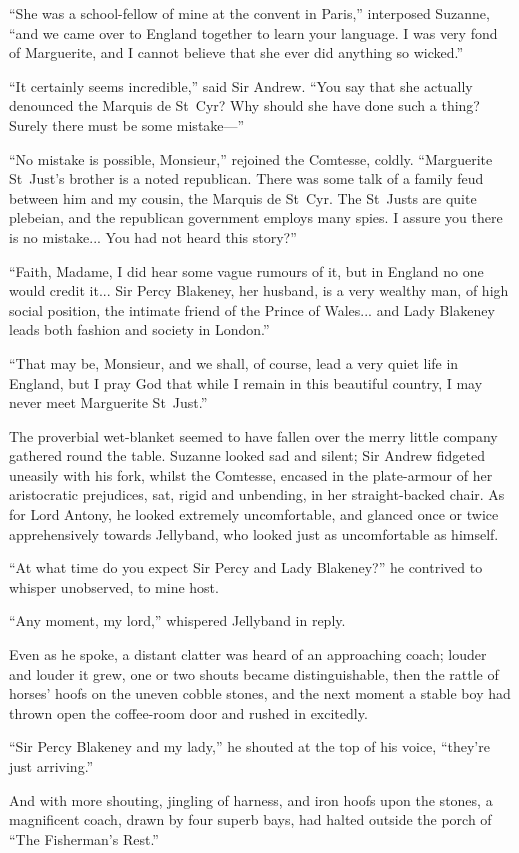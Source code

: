 \enquote{She was a school-fellow of mine at the convent in Paris,} interposed Suzanne, \enquote{and we came over to England together to learn your language. I was very fond of Marguerite, and I cannot believe that she ever did anything so wicked.}

\enquote{It certainly seems incredible,} said Sir Andrew. \enquote{You say that she actually denounced the Marquis de St~Cyr? Why should she have done such a thing? Surely there must be some mistake---}

\enquote{No mistake is possible, Monsieur,} rejoined the Comtesse, coldly. \enquote{Marguerite St~Just's brother is a noted republican. There was some talk of a family feud between him and my cousin, the Marquis de St~Cyr. The St~Justs are quite plebeian, and the republican government employs many spies. I assure you there is no mistake... You had not heard this story?}

\enquote{Faith, Madame, I did hear some vague rumours of it, but in England no one would credit it... Sir Percy Blakeney, her husband, is a very wealthy man, of high social position, the intimate friend of the Prince of Wales... and Lady Blakeney leads both fashion and society in London.}

\enquote{That may be, Monsieur, and we shall, of course, lead a very quiet life in England, but I pray God that while I remain in this beautiful country, I may never meet Marguerite St~Just.}

The proverbial wet-blanket seemed to have fallen over the merry little company gathered round the table. Suzanne looked sad and silent; Sir Andrew fidgeted uneasily with his fork, whilst the Comtesse, encased in the plate-armour of her aristocratic prejudices, sat, rigid and unbending, in her straight-backed chair. As for Lord Antony, he looked extremely uncomfortable, and glanced once or twice apprehensively towards Jellyband, who looked just as uncomfortable as himself.

\enquote{At what time do you expect Sir Percy and Lady Blakeney?} he contrived to whisper unobserved, to mine host.

\enquote{Any moment, my lord,} whispered Jellyband in reply.

Even as he spoke, a distant clatter was heard of an approaching coach; louder and louder it grew, one or two shouts became distinguishable, then the rattle of horses’ hoofs on the uneven cobble stones, and the next moment a stable boy had thrown open the coffee-room door and rushed in excitedly.

\enquote{Sir Percy Blakeney and my lady,} he shouted at the top of his voice, \enquote{they're just arriving.}

And with more shouting, jingling of harness, and iron hoofs upon the stones, a magnificent coach, drawn by four superb bays, had halted outside the porch of \enquote{The Fisherman's Rest.}
